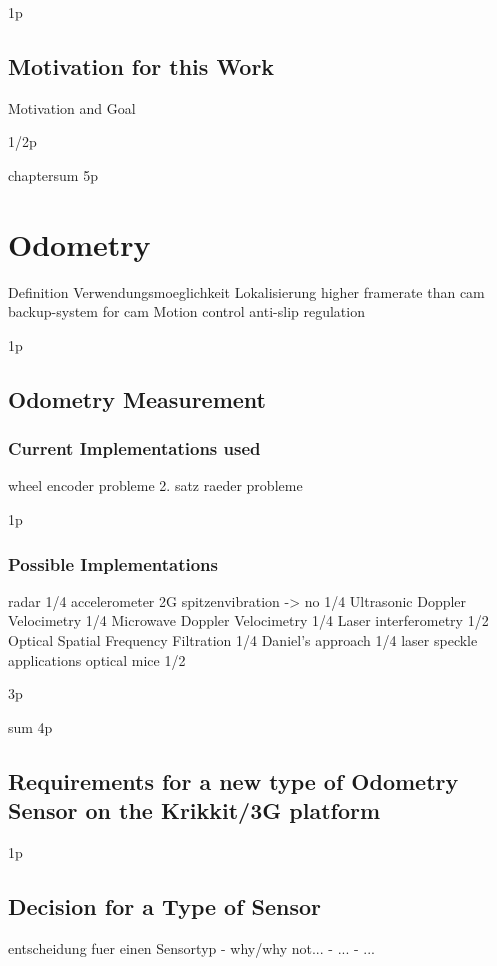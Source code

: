 \documentclass[12pt,a4paper]{article}
\begin{document}
1p

\subsection{Motivation for this Work}
    
Motivation and Goal

1/2p

chaptersum 5p

\section{Odometry}
  Definition
  Verwendungsmoeglichkeit
    Lokalisierung
      higher framerate than cam
      backup-system for cam
    Motion control
      anti-slip regulation

1p

\subsection{Odometry Measurement}

\subsubsection{Current Implementations used}

      wheel encoder
        probleme
      2. satz raeder
        probleme

1p

\subsubsection{Possible Implementations}

      radar
1/4
      accelerometer
        2G spitzenvibration -> no
1/4
      Ultrasonic Doppler Velocimetry
1/4
      Microwave Doppler Velocimetry
1/4
      Laser interferometry
1/2
      Optical Spatial Frequency Filtration
1/4
        Daniel's approach
1/4
        laser speckle applications
        optical mice
1/2

3p

sum 4p

\subsection{Requirements for a new type of Odometry Sensor on the Krikkit/3G platform}

1p


\subsection{Decision for a Type of Sensor}
  entscheidung fuer einen Sensortyp
    - why/why not...
    - ...
    - ...
\end{document}
